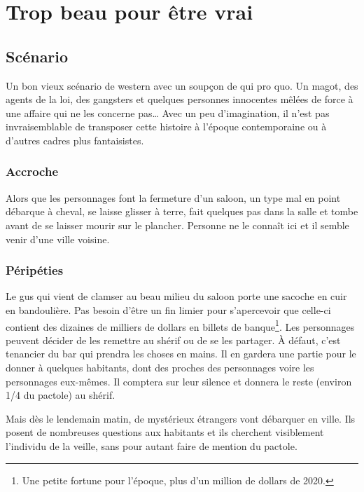 \chapter{Trop beau pour être vrai}

\section{Scénario}

Un bon vieux scénario de western avec un soupçon de qui pro quo.
Un magot, des agents de la loi, des gangsters et quelques personnes \og innocentes \fg mêlées de force à une affaire qui ne les concerne pas\dots
Avec un peu d'imagination, il n'est pas invraisemblable de transposer cette histoire à l'époque contemporaine ou à d'autres cadres plus fantaisistes.

\subsection{Accroche}

Alors que les personnages font la fermeture d'un saloon, un type mal en point débarque à cheval, se laisse glisser à terre, fait quelques pas dans la salle et tombe avant de se laisser mourir sur le plancher.
Personne ne le connaît ici et il semble venir d'une ville voisine.

\subsection{Péripéties}

Le gus qui vient de clamser au beau milieu du saloon porte une sacoche en cuir en bandoulière.
Pas besoin d'être un fin limier pour s'apercevoir que celle-ci contient des dizaines de milliers de dollars en billets de banque\footnote{Une petite fortune pour l'époque, plus d'un million de dollars de 2020.}.
Les personnages peuvent décider de les remettre au shérif ou de se les partager.
À défaut, c'est tenancier du bar qui prendra les choses en mains.
Il en gardera une partie pour le donner à quelques habitants, dont des proches des personnages voire les personnages eux-mêmes.
Il comptera sur leur silence et donnera le reste (environ 1/4 du pactole) au shérif.

Mais dès le lendemain matin, de mystérieux étrangers vont débarquer en ville.
Ils posent de nombreuses questions aux habitants et ils cherchent visiblement l'individu de la veille, sans pour autant faire de mention du pactole.

